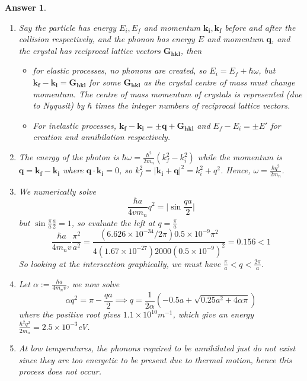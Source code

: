 \documentclass[a4paper]{article}
\newtheorem{ans}{Answer}[subsection]
\theoremstyle{new}
\begin{document}
\begin{ans}\leavevmode
\begin{enumerate}[label=(\roman*)]
\item Say the particle has energy $E_i, E_f$ and momentum $\mathbf{k_i}, \mathbf{k_f}$ before and after the collision respectively, and the phonon has energy $E$ and momentum $\mathbf{q}$, and the crystal has reciprocal lattice vectors $\mathbf{G_{hkl}}$, then
\begin{itemize}
    \item for elastic processes, no phonons are created, so $E_i=E_f+\hbar\omega$, but $\mathbf{k_f}-\mathbf{k_i}=\mathbf{G_{hkl}}$ for some $\mathbf{G_{hkl}}$ as the crystal centre of mass must change momentum. The centre of mass momentum of crystals is represented (due to Nyqusit) by $\hbar$ times the integer numbers of reciprocal lattice vectors.
    \item For inelastic processes, $\mathbf{k_f}-\mathbf{k_i}=\pm\mathbf{q}+\mathbf{G_{hkl}}$ and $E_f-E_i=\pm E'$ for creation and annihilation respectively.
\end{itemize}
\item The energy of the photon is $\hbar\omega=\frac{\hbar^2}{2m_n}(k_f^2-k_i^2)$ while the momentum is $\mathbf{q}=\mathbf{k_f}-\mathbf{k_i}$ where $\mathbf{q}\cdot\mathbf{k_i}=0$, so $k_f^2=|\mathbf{k_i}+\mathbf{q}|^2=k_i^2+q^2$. Hence, $\omega=\frac{\hbar q^2}{2m_n}$.
\item We numerically solve
$$\frac{\hbar a}{4 v m_n}q^2=\bigg|\sin\frac{qa}{2}\bigg|$$
but $\sin\frac{\pi}{a}\frac{a}{2}=1$, so evaluate the left at $q=\frac{\pi}{a}$
$$\frac{\hbar a}{4m_nv}\frac{\pi^2}{a^2}=\frac{(6.626\times10^{-34}/2\pi)0.5\times10^{-9}\pi^2}{4(1.67\times10^{-27})2000(0.5\times10^{-9})^2}=0.156<1$$
So looking at the intersection graphically, we must have $\frac{\pi}{a}<q<\frac{2\pi}{a}$.
\item Let $\alpha:=\frac{\hbar a}{4m_nv}$, we now solve
$$\alpha q^2=\pi-\frac{qa}{2}\implies q=\frac{1}{2\alpha}(-0.5a+\sqrt{0.25a^2+4\alpha\pi})$$
where the positive root gives $1.1\times10^{10}m^{-1}$, which give an energy $\frac{\hbar^2q^2}{2m_n}=2.5\times10^{-3}$eV. 
\item At low temperatures, the phonons required to be annihilated just do not exist since they are too energetic to be present due to thermal motion, hence this process does not occur.

\end{enumerate}
\end{ans}
\newpage
\end{document}
